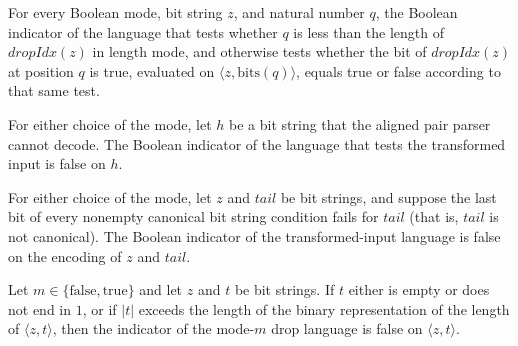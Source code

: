\begin{lemma}
\label{Complexity.drop_lang_pair}
\leanok
{}
For every Boolean mode, bit string $z$, and natural number $q$, the Boolean indicator of
the language that tests whether $q$ is less than the length of $dropIdx(z)$ in length
mode, and otherwise tests whether the bit of $dropIdx(z)$ at position $q$ is true,
evaluated on $\langle z,\mathrm{bits}(q)\rangle$, equals true or false according to that
same test.
\end{lemma}

\begin{lemma}
\label{Complexity.drop_bad_shape}
\leanok
{}
For either choice of the mode, let $h$ be a bit string that the aligned pair parser
cannot decode. The Boolean indicator of the language that tests the transformed input is
false on $h$.
\end{lemma}

\begin{lemma}
\label{Complexity.drop_bad_tail}
\leanok
{}
For either choice of the mode, let $z$ and $tail$ be bit strings, and suppose the last
bit of every nonempty canonical bit string condition fails for $tail$ (that is, $tail$
is not canonical). The Boolean indicator of the transformed-input language is false on
the encoding of $z$ and $tail$.
\end{lemma}

\begin{lemma}
\label{Complexity.drop_rejected_tail}
\leanok
{}
Let $m\in\{\mathrm{false},\mathrm{true}\}$ and let $z$ and $t$ be bit strings. If $t$
either is empty or does not end in $1$, or if $|t|$ exceeds the length of the binary
representation of the length of $\langle z,t\rangle$, then the indicator of the mode-$m$
drop language is false on $\langle z,t\rangle$.
\end{lemma}

